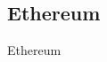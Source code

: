 \subsection{Ethereum\label{ethereum}}
\begin{otherlanguage}{english}

Ethereum \cite{buterin2017ethereum}

\end{otherlanguage}